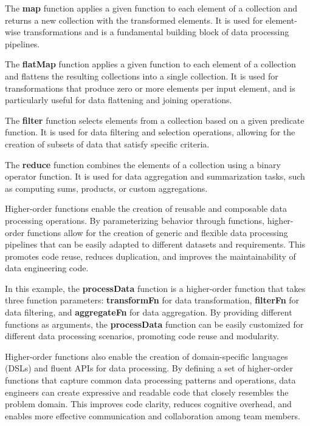The \textbf{map} function applies a given function to each element of a collection and returns a new collection with the transformed elements. It is used for element-wise transformations and is a fundamental building block of data processing pipelines.



The \textbf{flatMap} function applies a given function to each element of a collection and flattens the resulting collections into a single collection. It is used for transformations that produce zero or more elements per input element, and is particularly useful for data flattening and joining operations.



The \textbf{filter} function selects elements from a collection based on a given predicate function. It is used for data filtering and selection operations, allowing for the creation of subsets of data that satisfy specific criteria.



The \textbf{reduce} function combines the elements of a collection using a binary operator function. It is used for data aggregation and summarization tasks, such as computing sums, products, or custom aggregations.



Higher-order functions enable the creation of reusable and composable data processing operations. By parameterizing behavior through functions, higher-order functions allow for the creation of generic and flexible data processing pipelines that can be easily adapted to different datasets and requirements. This promotes code reuse, reduces duplication, and improves the maintainability of data engineering code.



In this example, the \textbf{processData} function is a higher-order function that takes three function parameters: \textbf{transformFn} for data transformation, \textbf{filterFn} for data filtering, and \textbf{aggregateFn} for data aggregation. By providing different functions as arguments, the \textbf{processData} function can be easily customized for different data processing scenarios, promoting code reuse and modularity.

Higher-order functions also enable the creation of domain-specific languages (DSLs) and fluent APIs for data processing. By defining a set of higher-order functions that capture common data processing patterns and operations, data engineers can create expressive and readable code that closely resembles the problem domain. This improves code clarity, reduces cognitive overhead, and enables more effective communication and collaboration among team members.

